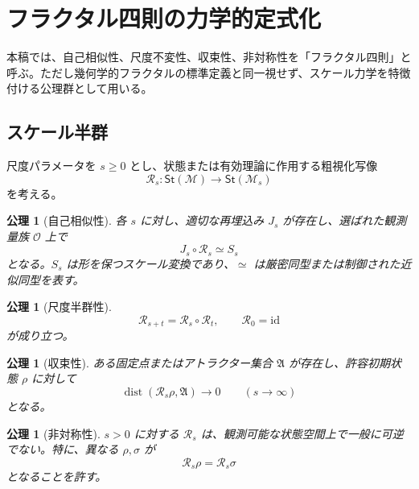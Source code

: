\documentclass[a4paper,11pt]{ltjsarticle}
\newtheorem{axiom}[definition]{公理}
\theoremstyle{remark}
\newcommand{\M}{\mathcal{M}}
\newcommand{\id}{\mathrm{id}}
\newcommand{\St}{\mathsf{St}}
\begin{document}
\section{フラクタル四則の力学的定式化}

本稿では、自己相似性、尺度不変性、収束性、非対称性を「フラクタル四則」と呼ぶ。ただし幾何学的フラクタルの標準定義と同一視せず、スケール力学を特徴付ける公理群として用いる。

\subsection{スケール半群}
尺度パラメータを $s\geq0$ とし、状態または有効理論に作用する粗視化写像
\begin{equation}
 \mathcal R_s:\St(\M)\longrightarrow\St(\M_s)
\end{equation}
を考える。

\begin{axiom}[自己相似性]
各 $s$ に対し、適切な再埋込み $J_s$ が存在し、選ばれた観測量族 $\mathcal O$ 上で
\begin{equation}
 J_s\circ\mathcal R_s\simeq S_s
\end{equation}
となる。$S_s$ は形を保つスケール変換であり、$\simeq$ は厳密同型または制御された近似同型を表す。
\end{axiom}

\begin{axiom}[尺度半群性]
\begin{equation}
 \mathcal R_{s+t}=\mathcal R_s\circ\mathcal R_t,
 \qquad \mathcal R_0=\id
 \label{eq:rgsemigroup}
\end{equation}
が成り立つ。
\end{axiom}

\begin{axiom}[収束性]
ある固定点またはアトラクター集合 $\mathfrak A$ が存在し、許容初期状態 $\rho$ に対して
\begin{equation}
 \operatorname{dist}(\mathcal R_s\rho,\mathfrak A)
 \longrightarrow0\qquad(s\to\infty)
 \label{eq:convergence}
\end{equation}
となる。
\end{axiom}

\begin{axiom}[非対称性]
$s>0$ に対する $\mathcal R_s$ は、観測可能な状態空間上で一般に可逆でない。特に、異なる $\rho,\sigma$ が
\begin{equation}
 \mathcal R_s\rho=\mathcal R_s\sigma
\end{equation}
となることを許す。
\end{axiom}
\end{document}
